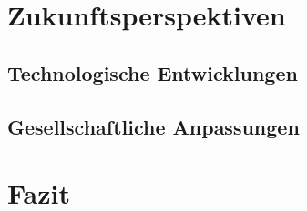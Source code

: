 \documentclass[a4paper,12pt]{article}
\begin{document}
\section{Zukunftsperspektiven}
\subsection{Technologische Entwicklungen}
\subsection{Gesellschaftliche Anpassungen}
\newpage

\section{Fazit}



\newpage
{}
\end{document}
